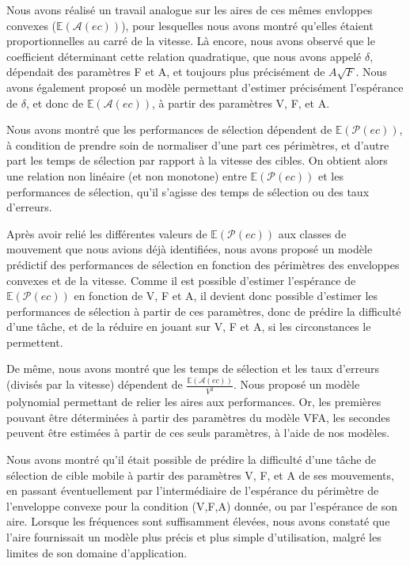 	Nous avons réalisé un travail analogue sur les aires de ces mêmes envloppes convexes ($\mathbb{E}(\mathcal{A}(ec))$), pour lesquelles nous avons montré qu'elles étaient proportionnelles au carré de la vitesse. Là encore, nous avons observé que le coefficient déterminant cette relation quadratique, que nous avons appelé $\delta$, dépendait des paramètres F et A, et toujours plus précisément de $A\sqrt{F}$. Nous avons également proposé un modèle permettant d'estimer précisément l'espérance de $\delta$, et donc de $\mathbb{E}(\mathcal{A}(ec))$, à partir des paramètres V, F, et A.
	
	Nous avons montré que les performances de sélection dépendent de $\mathbb{E}(\mathcal{P}(ec))$, à condition de prendre soin de normaliser d'une part ces périmètres, et d'autre part les temps de sélection par rapport à la vitesse des cibles. On obtient alors une relation non linéaire (et non monotone) entre $\mathbb{E}(\mathcal{P}(ec))$ et les performances de sélection, qu'il s'agisse des temps de sélection ou des taux d'erreurs.
	
	Après avoir relié les différentes valeurs de $\mathbb{E}(\mathcal{P}(ec))$ aux classes de mouvement que nous avions déjà identifiées, nous avons proposé un modèle prédictif des performances de sélection en fonction des périmètres des enveloppes convexes et de la vitesse. Comme il est possible d'estimer l'espérance de $\mathbb{E}(\mathcal{P}(ec))$ en fonction de V, F et A, il devient donc possible d'estimer les performances de sélection à partir de ces paramètres, donc de prédire la difficulté d'une tâche, et de la réduire en jouant sur V, F et A, si les circonstances le permettent.
	
	De même, nous avons montré que les temps de sélection et les taux d'erreurs (divisés par la vitesse) dépendent de $\frac{\mathbb{E}(\mathcal{A}(ec))}{V^{2}}$. Nous proposé un modèle polynomial permettant de relier les aires aux performances. Or, les premières pouvant être déterminées à partir des paramètres du modèle VFA, les secondes peuvent être estimées à partir de ces seuls paramètres, à l'aide de nos modèles.
	
	Nous avons montré qu'il était possible de prédire la difficulté d'une tâche de sélection de cible mobile à partir des paramètres V, F, et A de ses mouvements, en passant éventuellement par l'intermédiaire de l'espérance du périmètre de l'enveloppe convexe pour la condition (V,F,A) donnée, ou par l'espérance de son aire. Lorsque les fréquences sont suffisamment élevées, nous avons constaté que l'aire fournissait un modèle plus précis et plus simple d'utilisation, malgré les limites de son domaine d'application.

\clearpage
